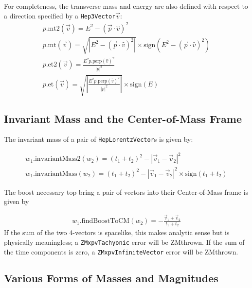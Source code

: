 \documentclass[twoside,12pt]{article}
\def \SV {{\tt Hep3Vector}}
\def \LV {{\tt HepLorentzVector}}
\begin{document}
\noindent
For completeness, the transverse mass and energy are also defined with respect 
to a direction specified by a \SV $\vec{v}$:
\begin{eqnarray}
  p\mbox{.mt2}(\vec{v}) = E^2 - ( \vec{p} \cdot \hat{v} )^2   \\
  p\mbox{.mt}(\vec{v}) = \sqrt {\left| E^2 - (\vec{p} \cdot \hat{v})^2\right|}
			\times \mbox{sign}(E^2 - ( \vec{p} \cdot \hat{v} )^2 )
			\\
  p\mbox{.et2}(\vec{v}) = \frac {E^2 p.\mbox{perp}(\hat{v})^2} {|p|^2} \\
  p\mbox{.et}(\vec{v}) = \sqrt { \left| \frac {E^2 p.\mbox{perp}(\hat{v})^2}
			{|p|^2} \right| } 
			\times \mbox{sign}(E)
\end{eqnarray}





\subsection{Invariant Mass and the Center-of-Mass Frame}

The invariant mass of a pair of \LV s is given by:

\begin{eqnarray}
\label{eq:winvMass2}
  w_1\mbox{.invariantMass2}(w_2) =
	\left(t_1+t_2\right)^2 - \left| \vec{v}_1 -  \vec{v}_2 \right| ^2 \\
\label{eq:winvMass}
  w_1\mbox{.invariantMass}(w_2) =
	\left(t_1+t_2\right)^2 - \left| \vec{v}_1 -  \vec{v}_2 \right| ^2
	\times \mbox{sign}(t_1 + t_2)
\end{eqnarray}

The boost necessary top bring a pair of vectors into their Center-of-Mass
frame is given by

\begin{eqnarray}
\label{eq:wfindBoost}
  w_1\mbox{.findBoostToCM}(w_2) = - \frac{\vec{v}_1 + \vec{v}_2}{t_1+t_2}
\end{eqnarray}
\noindent
If the sum of the two 4-vectors is spacelike, this makes analytic sense but
is physically meaningless; a {\tt ZMxpvTachyonic} error will be ZMthrown.
If the sum of the time components is zero, a
{\tt ZMxpvInfiniteVector} error will be ZMthrown.

\subsection{Various Forms of Masses and Magnitudes}
\end{document}
